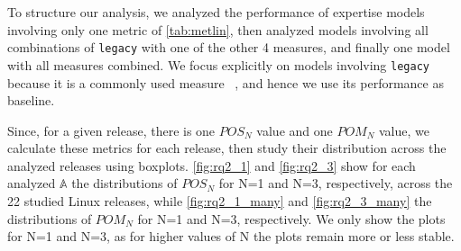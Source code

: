 To structure our analysis, we analyzed the performance of expertise models involving only one metric of \autoref{tab:metlin}, then analyzed models involving all combinations of \texttt{legacy} with one of the other 4 measures, and finally one model with all measures combined. We focus explicitly on models involving \texttt{legacy} because it is a commonly used measure ~\citep{Rahman-2011}, and hence we use its performance as baseline. %

Since, for a given release, there is one $POS_N$ value and one $POM_N$ value, we calculate these metrics for each release, then study their distribution across the analyzed releases using boxplots. %
\autoref{fig:rq2_1} and \autoref{fig:rq2_3} show for each analyzed $\mathbb{A}$ %
the distributions of $POS_N$ for N=1 and N=3, respectively, across the 22 studied Linux releases, while \autoref{fig:rq2_1_many} and \autoref{fig:rq2_3_many} the distributions of $POM_N$ for N=1 and N=3, respectively. %
We only show the plots for N=1 and N=3, as for higher values of N the plots remain more or less stable.




